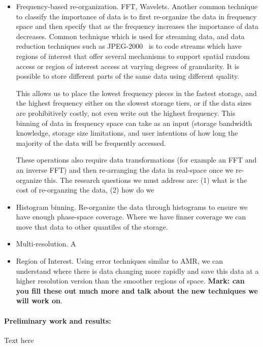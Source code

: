 \begin{itemize}
\item Frequency-based re-organization. FFT, Wavelets.
Another common technique to classify the importance of data is to first re-organize the data
in frequency space and then specify that as the frequency increases the importance of data
decreases.   Common technique which is used for streaming data, and data reduction techniques such as JPEG-2000~\cite{jpeg2000}
is to  code streams which have regions of interest that offer several mechanisms to support spatial random access or region of interest access at varying degrees of granularity. It is possible to store different parts of the same data using different quality.

This allows us to place the lowest frequency pieces in the fastest storage, and
the highest frequency either on the slowest storage tiers, or if the data sizes are prohibitively  
costly, not even write out the highest frequency. This binning of data in frequency space can
take as an input (storage bandwidth knowledge, storage size limitations, and user intentions
of how long the majority of the data will be frequently accessed. 

These operations also require data transformations (for example an FFT and an inverse FFT)
and then re-arranging the data in real-space once we re-organize this. The research questions
we must address are: (1) what is the cost of re-organzing the data, (2) how do we 

\item Histogram binning. Re-organize the data through histograms to ensure we have enough
phase-space coverage. Where we have finner coverage we can move that data to other
quantiles of the storage. 

\item Multi-resolution.  
A


\item Region of Interest. Using error techniques similar to AMR, we can understand where there
is data changing more rapidly and save this data at a higher resolution version than the smoother
regions of space.
{\bf Mark: can you fill these out much more and talk about the new techniques we will work on}.
\end{itemize}
\paragraph{Preliminary work and results:}
Text here
